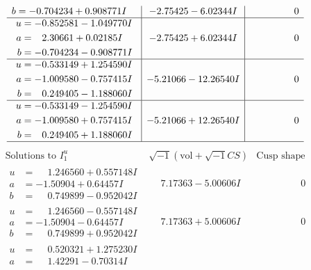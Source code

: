 \documentclass[1p]{elsarticle_modified}
\theoremstyle{definition}
\newcommand{\I}{\sqrt{-1}}
\begin{document}
$$\begin{array}{c|c|c}
\begin{aligned}
b &= -0.704234 + 0.908771 I\end{aligned}
 & -2.75425 - 6.02344 I & \phantom{-0.000000 } 0 \\ \hline\begin{aligned}
u &= -0.852581 - 1.049770 I \\
a &= \phantom{-}2.30661 + 0.02185 I \\
b &= -0.704234 - 0.908771 I\end{aligned}
 & -2.75425 + 6.02344 I & \phantom{-0.000000 } 0 \\ \hline\begin{aligned}
u &= -0.533149 + 1.254590 I \\
a &= -1.009580 - 0.757415 I \\
b &= \phantom{-}0.249405 - 1.188060 I\end{aligned}
 & -5.21066 - 12.26540 I & \phantom{-0.000000 } 0 \\ \hline\begin{aligned}
u &= -0.533149 - 1.254590 I \\
a &= -1.009580 + 0.757415 I \\
b &= \phantom{-}0.249405 + 1.188060 I\end{aligned}
 & -5.21066 + 12.26540 I & \phantom{-0.000000 } 0\\
 \hline 
 \end{array}$$\newpage$$\begin{array}{c|c|c}  
\text{Solutions to }I^u_{1}& \I (\text{vol} + \sqrt{-1}CS) & \text{Cusp shape}\\
 \hline 
\begin{aligned}
u &= \phantom{-}1.246560 + 0.557148 I \\
a &= -1.50904 + 0.64457 I \\
b &= \phantom{-}0.749899 - 0.952042 I\end{aligned}
 & \phantom{-}7.17363 - 5.00606 I & \phantom{-0.000000 } 0 \\ \hline\begin{aligned}
u &= \phantom{-}1.246560 - 0.557148 I \\
a &= -1.50904 - 0.64457 I \\
b &= \phantom{-}0.749899 + 0.952042 I\end{aligned}
 & \phantom{-}7.17363 + 5.00606 I & \phantom{-0.000000 } 0 \\ \hline\begin{aligned}
u &= \phantom{-}0.520321 + 1.275230 I \\
a &= \phantom{-}1.42291 - 0.70314 I \\

\end{aligned}
\end{array}$$
\end{document}
